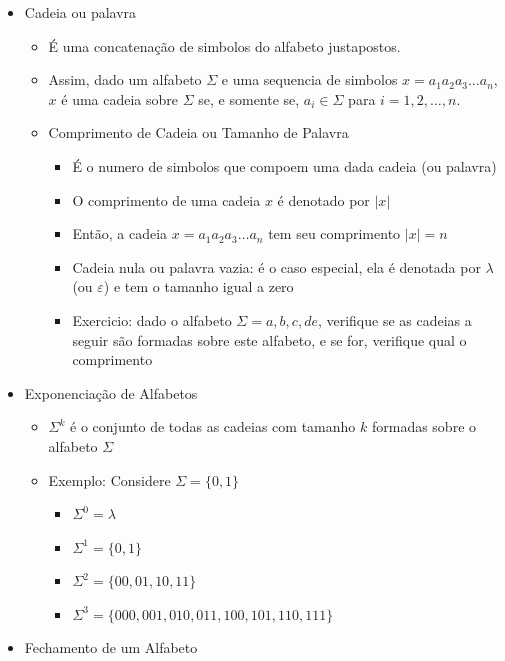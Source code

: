 \documentclass[12pt]{article}
\begin{document}
\begin{itemize}
    \item Cadeia ou palavra
    \begin{itemize}
        \item É uma concatenação de simbolos do alfabeto justapostos.
        \item Assim, dado um alfabeto \(\Sigma\) e uma sequencia de simbolos 
        \(x=a_1a_2a_3\ldots a_n\), \(x\) é uma cadeia sobre \(\Sigma\) se, e 
        somente se, \(a_i\in\Sigma\) para \(i=1,2,\dots,n\).
        \item Comprimento de Cadeia ou Tamanho de Palavra
        \begin{itemize}
            \item É o numero de simbolos que compoem uma dada cadeia (ou palavra)
            \item O comprimento de uma cadeia $x$ é denotado por $|x|$
            \item Então, a cadeia \(x=a_1a_2a_3\ldots a_n\) tem seu comprimento 
            \(|x|=n\)
            \item Cadeia nula ou palavra vazia: é o caso especial, ela é 
            denotada por \(\lambda\) (ou \(\varepsilon\)) e tem o tamanho igual 
            a zero
            \item Exercicio: dado o alfabeto \(\Sigma={a,b,c,de}\), verifique 
            se as cadeias a seguir são formadas sobre este alfabeto, e se for, 
            verifique qual o comprimento 
        \end{itemize}
    \end{itemize}
    \item Exponenciação de Alfabetos
    \begin{itemize}
        \item \(\Sigma^k\) é o conjunto de todas as cadeias com tamanho \(k\) 
        formadas sobre o alfabeto \(\Sigma\)
        \item Exemplo: Considere \(\Sigma=\{0,1\}\)
        \begin{itemize}
            \item \(\Sigma^0 = \lambda\)
            \item \(\Sigma^1 = \{0,1\}\)
            \item \(\Sigma^2 = \{00,01,10,11\}\)
            \item \(\Sigma^3 = \{000,001,010,011,100,101,110,111\}\)
        \end{itemize}
    \end{itemize}
    \item Fechamento de um Alfabeto

\end{itemize}
\end{document}
